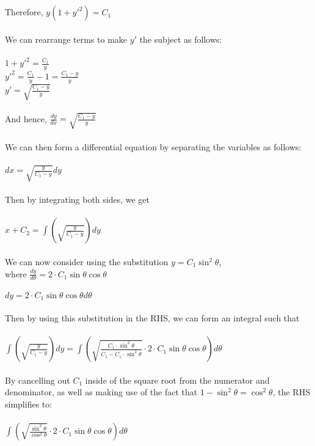 \documentclass[12pt]{report}
\begin{document}
\\
\\
Therefore, \(y(1+y'^2) = C_{1}\)
\\
\\
We can rearrange terms to make \(y'\) the subject as follows:
\\
\\
\(1+y'^2 = \frac{C_{1}}{y}\)
\\
\implies \(y'^2 = \frac{C_{1}}{y}-1 = \frac{C_{1}-y}{y}\)
\\
\implies \(y' = \sqrt{\frac{C_{1}-y}{y}}\)
\\
\\
And hence, \(\frac{dy}{dx} = \sqrt{\frac{C_{1}-y}{y}}\)
\\
\\
We can then form a differential equation by separating the variables as follows:
\\
\\
\({dx} = \sqrt{\frac{y}{C_{1}-y}}{dy}\)
\\
\\
Then by integrating both sides, we get
\\
\\
\(x + C_{2} = \int (\sqrt{\frac{y}{C_{1}-y}})dy\)
\\
\\
We can now consider using the substitution \(y = C_{1}\sin^2{\theta}\), 
\\
where \(\frac{dy}{d\theta} = 2 \cdot C_{1}\sin{\theta}\cos{\theta}\)
\\
\\
\implies\(dy = 2 \cdot C_{1}\sin{\theta}\cos{\theta} d\theta\)
\\
\\
Then by using this substitution in the RHS, we can form an integral such that
\\
\\
\(\int (\sqrt{\frac{y}{C_{1}-y}})dy = \int(\sqrt{\frac{C_{1}\cdot \sin^2{\theta}}{C_{1}-C_{1}\cdot \sin^2{\theta}}} \cdot 2 \cdot C_{1}\sin{\theta}\cos{\theta}) d\theta\)
\\
\\
By cancelling out \(C_{1}\) inside of the square root from the numerator and denominator, as well as making use of the fact that \(1-\sin^2{\theta} = \cos^2{\theta}\), the RHS simplifies to:
\\
\\
\(\int(\sqrt{\frac{\sin^2{\theta}}{\cos^2{\theta}}} \cdot 2 \cdot C_{1}\sin{\theta}\cos{\theta}) d\theta\)
\\
\end{document}
